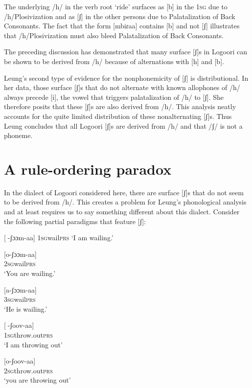 \documentclass[output=paper]{langsci/langscibook}
\begin{document}
The underlying /h/ in the verb root ‘ride’ surfaces as [b] in the 1\textsc{sg} due to /h/Plosivization and as [ʃ] in the other persons due to Palatalization of Back Consonants. The fact that the form [mbiɾaa] contains [b] and not [ʃ] illustrates that /h/Plosivization must also bleed Palatalization of Back Consonants. 

The preceding discussion has demonstrated that many surface [ʃ]s in Logoori can be shown to be derived from /h/ because of alternations with [h] and [b]. 

Leung’s second type of evidence for the nonphonemicity of [ʃ] is distributional. In her data, those surface [ʃ]s that do not alternate with known allophones of /h/ always precede [i], the vowel that triggers palatalization of /h/ to [ʃ]. She therefore posits that these [ʃ]s are also derived from /h/. This analysis neatly accounts for the quite limited distribution of these nonalternating [ʃ]s. Thus Leung concludes that all Logoori [ʃ]s are derived from /h/ and that /ʃ/ is not a phoneme.

\section{A rule-ordering paradox}

In the dialect of Logoori considered here, there are surface [ʃ]s that do not seem to be derived from /h/. This creates a problem for Leung’s phonological analysis and at least requires us to say something different about this dialect. Consider the following partial paradigms that feature [ʃ]:



\ea{} [-ʃɔɔm-aa]
\textsc{1sg}wail\textsc{prs}  
\glt ‘I am wailing.’
\z


\ea{}
 [o-ʃɔɔm-aa] \\
\textsc{2sg}wail\textsc{prs}  \\
\glt ‘You are wailing.’
\z


\ea{} 
[a-ʃɔɔm-aa] \\
\textsc{3sg}wail\textsc{prs}\\
\glt ‘He is wailing.’
\z


\ea{} 
[-ʃoov-aa]  \\
\textsc{1sg}throw.out\textsc{prs} \\
\glt ‘I am throwing out’
\z


\ea{}
 [o-ʃoov-aa]  \\
\textsc{2sg}throw.out\textsc{prs} \\
\glt ‘you are throwing out’
\z
\end{document}
